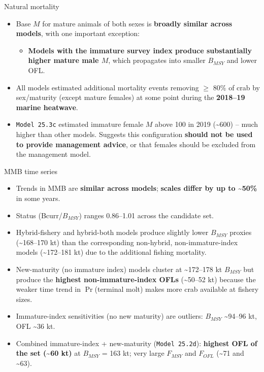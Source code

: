\documentclass[
  10pt,
  ignorenonframetext,
  aspectratio=169,
]{beamer}
\providecommand{\tightlist}{%
  \setlength{\itemsep}{0pt}\setlength{\parskip}{0pt}}
\begin{document}
\begin{frame}[fragile]{Natural mortality}
\label{natural-mortality}
\small

\begin{itemize}
\tightlist
\item
  Base \(M\) for mature animals of both sexes is \textbf{broadly similar
  across models}, with one important exception:

  \begin{itemize}
  \tightlist
  \item
    \textbf{Models with the immature survey index produce substantially
    higher mature male \(M\)}, which propagates into smaller \(B_{MSY}\)
    and lower OFL.
  \end{itemize}
\item
  All models estimated additional mortality events removing \(\geq\)
  80\% of crab by sex/maturity (except mature females) at some point
  during the \textbf{2018--19 marine heatwave}.
\item
  \texttt{Model\ 25.3c} estimated immature female \(M\) above 100 in
  2019 (\textasciitilde600) -- much higher than other models. Suggests
  this configuration \textbf{should not be used to provide management
  advice}, or that females should be excluded from the management model.
\end{itemize}
\end{frame}

\begin{frame}[fragile]{MMB time series}
\label{mmb-time-series}
\small

\begin{itemize}
\tightlist
\item
  Trends in MMB are \textbf{similar across models}; \textbf{scales
  differ by up to \textasciitilde50\%} in some years.
\item
  Status (Bcurr/\(B_{MSY}\)) ranges 0.86--1.01 across the candidate set.
\item
  Hybrid-fishery and hybrid-both models produce slightly lower
  \(B_{MSY}\) proxies (\textasciitilde168--170 kt) than the
  corresponding non-hybrid, non-immature-index models
  (\textasciitilde172--181 kt) due to the additional fishing mortality.
\item
  New-maturity (no immature index) models cluster at
  \textasciitilde172--178 kt \(B_{MSY}\) but produce the \textbf{highest
  non-immature-index OFLs} (\textasciitilde50--52 kt) because the weaker
  time trend in \(\Pr\)(terminal molt) makes more crab available at
  fishery sizes.
\item
  Immature-index sensitivities (no new maturity) are outliers:
  \(B_{MSY}\) \textasciitilde94--96 kt, OFL \textasciitilde36 kt.
\item
  Combined immature-index + new-maturity (\texttt{Model\ 25.2d}):
  \textbf{highest OFL of the set (\textasciitilde60 kt)} at \(B_{MSY}\)
  = 163 kt; very large \(F_{MSY}\) and \(F_{OFL}\) (\textasciitilde71
  and \textasciitilde63).
\end{itemize}
\end{frame}
\end{document}
